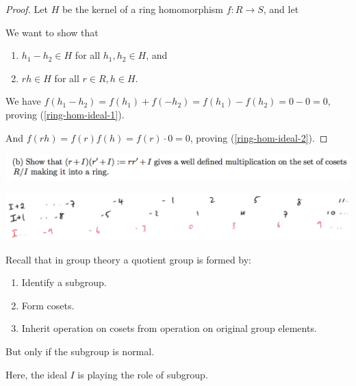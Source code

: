\begin{proof}
  Let $H$ be the kernel of a ring homomorphism $f:R \to S$, and let

  We want to show that
  \begin{enumerate}
  \item $h_1 - h_2 \in H$ for all $h_1, h_2 \in H$, and \label{ring-hom-ideal-1}
  \item $rh \in H$ for all $r \in R, h \in H$. \label{ring-hom-ideal-2}
  \end{enumerate}

  We have $f(h_1 - h_2) = f(h_1) + f(-h_2) = f(h_1) - f(h_2) = 0 - 0 = 0$, proving
  (\ref{ring-hom-ideal-1}).

  And $f(rh) = f(r)f(h) = f(r)\cdot 0 = 0$, proving (\ref{ring-hom-ideal-2}).

\end{proof}



\newpage
\begin{mdframed}
  \includegraphics[width=400pt]{img/linear-algebra-a0-1-5-b.png}\\
\end{mdframed}

\begin{mdframed}
  \includegraphics[width=400pt]{img/ideal-in-integers.png}
\end{mdframed}

\begin{mdframed}
  \begin{remark*}
    Recall that in group theory a quotient group is formed by:
    \begin{enumerate}
    \item Identify a subgroup.
    \item Form cosets.
    \item Inherit operation on cosets from operation on original group elements.
    \end{enumerate}
    But only if the subgroup is normal.

    Here, the ideal $I$ is playing the role of subgroup.~\\
  \end{remark*}
\end{mdframed}

